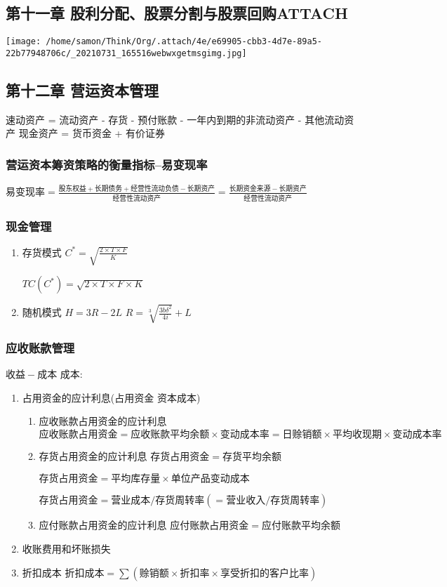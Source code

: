 \documentclass[12pt,a4paper]{article}
\begin{document}
\subsection{第十一章 股利分配、股票分割与股票回购\hfill{}\textsc{ATTACH}}
\label{sec:orgcef8e2c}
\begin{center}
\texttt{[image: /home/samon/Think/Org/.attach/4e/e69905-cbb3-4d7e-89a5-22b77948706c/\_20210731\_165516webwxgetmsgimg.jpg]}
\end{center}

\subsection{第十二章 营运资本管理}
\label{sec:org5accd2a}
速动资产 = 流动资产 - 存货 - 预付账款 - 一年内到期的非流动资产 - 其他流动资产
现金资产 = 货币资金 + 有价证券
\subsubsection{营运资本筹资策略的衡量指标--易变现率}
\label{sec:org89a2c50}
\(易变现率 = \frac{股东权益+长期债务+经营性流动负债-长期资产}{经营性流动资产} = \frac{长期资金来源-长期资产}{经营性流动资产}\)
\subsubsection{现金管理}
\label{sec:org6e5ebb3}
\begin{enumerate}
\item 存货模式
\label{sec:org73f3bd4}
\(C^{*}=\sqrt{\frac{2\times T\times F}{K}}\)

\(TC(C^{*})=\sqrt{2\times T\times F\times K}\)
\item 随机模式
\label{sec:org2281cd5}
\(H=3R-2L\)
\(R = \sqrt[3]{\frac{3b\delta^{2}}{4i}}+L\)
\end{enumerate}
\subsubsection{应收账款管理}
\label{sec:orgf57d0c8}
\(收益-成本\)
成本:
\begin{enumerate}
\item 占用资金的应计利息(占用资金 \texttimes{} 资本成本)
\begin{enumerate}
\item 应收账款占用资金的应计利息
\(应收账款占用资金 = 应收账款平均余额\times 变动成本率 =日赊销额\times 平均收现期 \times 变动成本率\)
\item 存货占用资金的应计利息
\(存货占用资金 = 存货平均余额\)

\(存货占用资金 = 平均库存量\times 单位产品变动成本\)

\(存货占用资金 = 营业成本/存货周转率(=营业收入/存货周转率)\)
\item 应付账款占用资金的应计利息
\(应付账款占用资金 = 应付账款平均余额\)
\end{enumerate}
\item 收账费用和坏账损失
\item 折扣成本
\(折扣成本=\sum(赊销额\times 折扣率\times 享受折扣的客户比率)\)
\end{enumerate}
\end{document}
